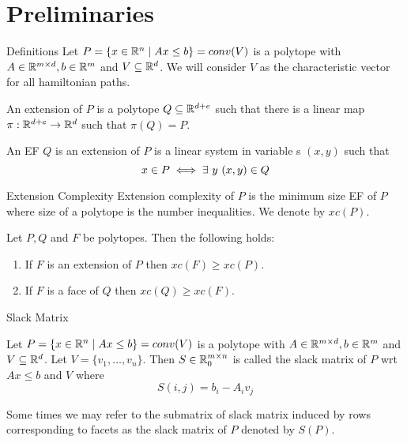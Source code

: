 \documentclass[aspectratio=1610]{beamer}
\begin{document}
\section{Preliminaries}
\begin{frame}{Definitions}
	Let $P=\{x\in\mathbb{R}^n\mid Ax\leq b\}=conv(V)$ is a polytope  with $A\in\mathbb{R}^{m\times d}, b\in \mathbb{R}^m$ and $V\subseteq \mathbb{R}^d$. We will consider $V$ as the characteristic vector for all hamiltonian paths.\pause

	\begin{definition}
		An extension of $P$ is a polytope $Q\subseteq \mathbb{R}^{d+e}$ such that there is a linear map $\pi:\mathbb{R}^{d+e}\to\mathbb{R}^{d}$ such that $\pi(Q)=P$.
	\end{definition}\pause

	\begin{definition}
		An EF $Q$ is an extension of $P$ is a linear system in variable s $(x,y)$ such that $$x\in P\iff \exists\ y\ (x,y)\in Q$$\pause

	\end{definition}
\end{frame}
\begin{frame}{Extension Complexity}
	Extension complexity of $P$ is the minimum size  EF of $P$ where size of a polytope is the number inequalities. We denote by $xc(P)$.\pause\vspace*{1cm}

	\begin{lemma}
		Let $P,Q$ and $F$ be polytopes. Then the following holds:
		\begin{enumerate}[label=(\roman*)]
			\item If $F$ is an extension of $P$ then $xc(F)\geq xc(P)$.
			\item If $F$ is a face of $Q$ then $xc(Q)\geq xc(F)$.
		\end{enumerate}
	\end{lemma}
\end{frame}
\begin{frame}{Slack Matrix}
	\begin{definition}
		Let $P=\{x\in\mathbb{R}^n\mid Ax\leq b\}=conv(V)$ is a polytope  with $A\in\mathbb{R}^{m\times d}, b\in \mathbb{R}^m$ and $V\subseteq \mathbb{R}^d$. Let $V=\{v_1,\dots, v_n\}$. Then $S\in\mathbb{R}^{m\times n}_{0}$ is called the slack matrix of $P$ wrt $Ax\leq b$ and $V$ where $$S(i,j)=b_i-A_iv_j$$
	\end{definition}

	Some times we may refer to the submatrix of slack matrix induced by rows corresponding to facets as the slack matrix of $P$ denoted by $S(P)$.

\end{frame}
\end{document}
